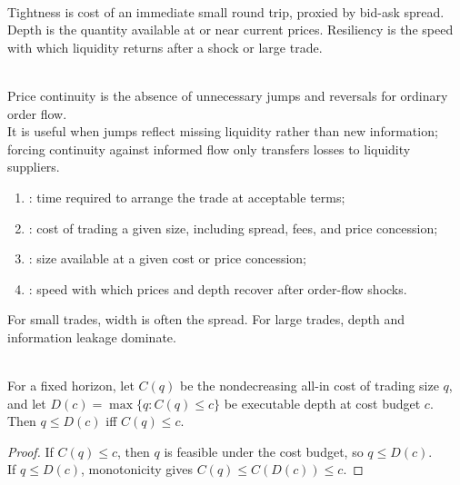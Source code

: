 \documentclass[a4paper,oneside,openany]{book}
\begin{document}
\begin{taxonomy} \\
Tightness is cost of an immediate small round trip, proxied by bid-ask spread. Depth is the quantity available at or near current prices. Resiliency is the speed with which liquidity returns after a shock or large trade.
\end{taxonomy}

\begin{definition} \\
Price continuity is the absence of unnecessary jumps and reversals for ordinary order flow.\\
It is useful when jumps reflect missing liquidity rather than new information; forcing continuity against informed flow only transfers losses to liquidity suppliers.
\end{definition}

\begin{taxonomy} 
\begin{enumerate}[label=\roman*.]
\setlength{\itemsep}{0pt}
\item {}: time required to arrange the trade at acceptable terms;
\item {}: cost of trading a given size, including spread, fees, and price concession;
\item {}: size available at a given cost or price concession;
\item {}: speed with which prices and depth recover after order-flow shocks.
\end{enumerate}
For small trades, width is often the spread. For large trades, depth and information leakage dominate.
\end{taxonomy}

\begin{proposition} \\
For a fixed horizon, let $C(q)$ be the nondecreasing all-in cost of trading size $q$, and let $D(c)=\max\{q:C(q)\le c\}$ be executable depth at cost budget $c$. Then $q\le D(c)$ iff $C(q)\le c$.
\begin{proof}
If $C(q)\le c$, then $q$ is feasible under the cost budget, so $q\le D(c)$.\\
If $q\le D(c)$, monotonicity gives $C(q)\le C(D(c))\le c$.
\end{proof}
\end{proposition}
\end{document}
